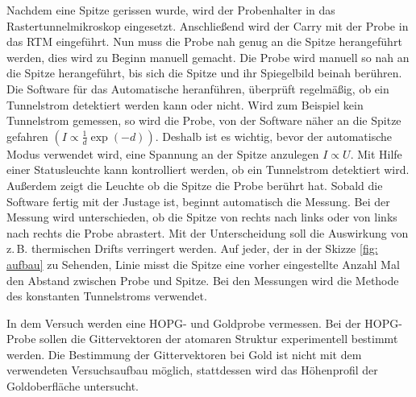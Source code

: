 Nachdem eine Spitze gerissen wurde, wird der Probenhalter in das Rastertunnelmikroskop eingesetzt.
Anschließend wird der Carry mit der Probe in das RTM eingeführt.
Nun muss die Probe nah genug an die Spitze herangeführt werden, dies wird zu Beginn
manuell gemacht. Die Probe wird manuell so nah an die Spitze herangeführt, bis sich
die Spitze und ihr Spiegelbild beinah berühren. Die Software für das Automatische
heranführen, überprüft regelmäßig, ob ein Tunnelstrom detektiert werden kann oder nicht. %
Wird zum Beispiel kein Tunnelstrom gemessen, so wird die Probe, von der Software %
näher an die Spitze gefahren $\left(I\propto \frac{1}{d}\exp{(-d)}\right)$.
Deshalb ist es wichtig, bevor der automatische
Modus verwendet wird, eine Spannung an der Spitze anzulegen $I\propto U$. Mit Hilfe einer
Statusleuchte kann kontrolliert werden, ob ein Tunnelstrom detektiert wird. Außerdem zeigt die Leuchte
ob die Spitze die Probe berührt hat.
Sobald die Software fertig mit der Justage ist, beginnt automatisch die Messung.
Bei der Messung wird unterschieden, ob die Spitze von rechts nach links oder von links nach rechts %
die Probe abrastert. Mit der Unterscheidung soll die Auswirkung von z.\,B. thermischen Drifts verringert werden. %
 Auf jeder, der in der Skizze \ref{fig: aufbau} zu Sehenden, Linie misst die Spitze eine %
vorher eingestellte Anzahl Mal den Abstand zwischen Probe und Spitze.
Bei den Messungen wird die Methode des konstanten Tunnelstroms verwendet.

In dem Versuch werden eine HOPG- und Goldprobe vermessen.
Bei der HOPG-Probe sollen die Gittervektoren der atomaren Struktur
experimentell bestimmt werden. Die Bestimmung der Gittervektoren
bei Gold ist nicht mit dem verwendeten Versuchsaufbau möglich, stattdessen %
wird das Höhenprofil der Goldoberfläche untersucht.
